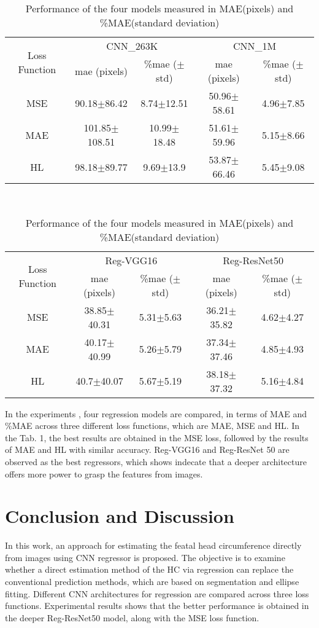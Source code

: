 \documentclass{article}
\begin{document}
\begin{table}[h]
\centering
\caption{Performance of the four models measured in MAE(pixels) and \%MAE(\pm standard deviation)}
\label{tab:regression_performance}
\begin{tabular}{|c|c|c|c|c|}
\hline
\multirow{2}{*}{Loss Function} & \multicolumn{2}{c|}{CNN\_263K} & \multicolumn{2}{c|}{CNN\_1M} \\
\cline{2-5}
 & mae (pixels) & \%mae ($\pm$ std) & mae (pixels) & \%mae ($\pm$ std) \\
\hline
MSE &90.18$\pm$86.42 &8.74$\pm$12.51 &50.96$\pm$58.61 &4.96$\pm$7.85 \\
MAE &101.85$\pm$108.51 &10.99$\pm$18.48 &51.61$\pm$59.96 &5.15$\pm$8.66 \\
HL &98.18$\pm$89.77 &9.69$\pm$13.9 &53.87$\pm$66.46 &5.45$\pm$9.08 \\
\hline
\end{tabular}
\\[10pt] %
\begin{tabular}{|c|c|c|c|c|}
\hline
\multirow{2}{*}{Loss Function} & \multicolumn{2}{c|}{Reg-VGG16} & \multicolumn{2}{c|}{Reg-ResNet50} \\
\cline{2-5}
 & mae (pixels) & \%mae ($\pm$ std) & mae (pixels) & \%mae ($\pm$ std) \\
\hline
MSE &38.85$\pm$40.31& 5.31$\pm$5.63& 36.21$\pm$35.82& 4.62$\pm$4.27\\
MAE &40.17$\pm$40.99& 5.26$\pm$5.79& 37.34$\pm$37.46& 4.85$\pm$4.93 \\
HL &40.7$\pm$40.07& 5.67$\pm$5.19& 38.18$\pm$37.32& 5.16$\pm$4.84 \\
\hline
\end{tabular}
\end{table}

In the experiments , four regression models are compared, in terms of MAE and \%MAE across three different loss functions, which are MAE, MSE and HL. In the Tab. 1, the best results are obtained in the MSE loss, followed by the results of MAE and HL with similar accuracy. Reg-VGG16 and Reg-ResNet 50 are observed as the best regressors, which shows indecate that a deeper architecture offers more power to grasp the features from images. 

\section{Conclusion and Discussion}
In this work, an approach for estimating the featal head circumference directly from images using CNN regressor is proposed. The objective is to examine whether a direct estimation method of the HC via regression can replace the conventional prediction methods, which are based on segmentation and ellipse fitting. Different CNN architectures for regression  are compared across three loss functions. Experimental results shows that the better performance is obtained in the deeper Reg-ResNet50 model, along with the MSE loss function.
\end{document}
